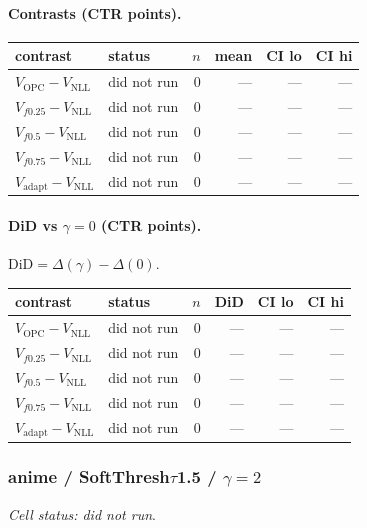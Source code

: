 \documentclass[10pt,a4paper]{article}
\begin{document}
\paragraph{Contrasts (CTR points).}
{\centering\small\begin{tabular}{llrrrr}
\toprule contrast & status & $n$ & mean & CI lo & CI hi \\
\midrule
$V_{\mathrm{OPC}}-V_{\mathrm{NLL}}$ & did not run & 0 & --- & --- & --- \\
$V_{f0.25}-V_{\mathrm{NLL}}$ & did not run & 0 & --- & --- & --- \\
$V_{f0.5}-V_{\mathrm{NLL}}$ & did not run & 0 & --- & --- & --- \\
$V_{f0.75}-V_{\mathrm{NLL}}$ & did not run & 0 & --- & --- & --- \\
$V_{\mathrm{adapt}}-V_{\mathrm{NLL}}$ & did not run & 0 & --- & --- & --- \\
\bottomrule\end{tabular}\par}
\paragraph{DiD vs $\gamma=0$ (CTR points).} $\mathrm{DiD}=\Delta(\gamma)-\Delta(0)$.
{\centering\small\begin{tabular}{llrrrr}
\toprule contrast & status & $n$ & DiD & CI lo & CI hi \\
\midrule
$V_{\mathrm{OPC}}-V_{\mathrm{NLL}}$ & did not run & 0 & --- & --- & --- \\
$V_{f0.25}-V_{\mathrm{NLL}}$ & did not run & 0 & --- & --- & --- \\
$V_{f0.5}-V_{\mathrm{NLL}}$ & did not run & 0 & --- & --- & --- \\
$V_{f0.75}-V_{\mathrm{NLL}}$ & did not run & 0 & --- & --- & --- \\
$V_{\mathrm{adapt}}-V_{\mathrm{NLL}}$ & did not run & 0 & --- & --- & --- \\
\bottomrule\end{tabular}\par}
\bigskip
\subsubsection{anime / SoftThresh$\tau$1.5 / $\gamma=2$}
\emph{Cell status: did not run}.
\end{document}
